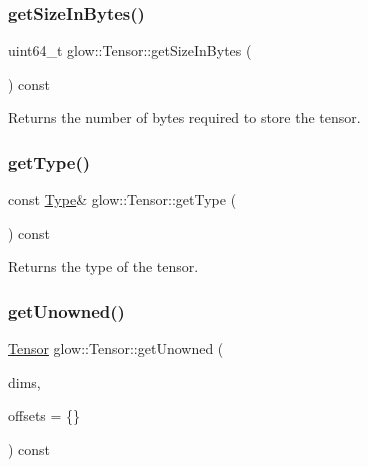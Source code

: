 \subsubsection{\texorpdfstring{get\+Size\+In\+Bytes()}{getSizeInBytes()}}
{\footnotesize\ttfamily uint64\+\_\+t glow\+::\+Tensor\+::get\+Size\+In\+Bytes (\begin{DoxyParamCaption}{ }\end{DoxyParamCaption}) const\hspace{0.3cm}{\ttfamily [inline]}}

\begin{DoxyReturn}{Returns}
the number of bytes required to store the tensor. 
\end{DoxyReturn}
\mbox{\label{classglow_1_1_tensor_aeb7622d21d76d06f4628386c9a2db733}} 
\subsubsection{\texorpdfstring{get\+Type()}{getType()}}
{\footnotesize\ttfamily const \hyperlink{structglow_1_1_type}{Type}\& glow\+::\+Tensor\+::get\+Type (\begin{DoxyParamCaption}{ }\end{DoxyParamCaption}) const\hspace{0.3cm}{\ttfamily [inline]}}

\begin{DoxyReturn}{Returns}
the type of the tensor. 
\end{DoxyReturn}
\mbox{\label{classglow_1_1_tensor_a2b71346a672215c780ec46d1925c6d03}} 
\subsubsection{\texorpdfstring{get\+Unowned()}{getUnowned()}}
{\footnotesize\ttfamily \hyperlink{classglow_1_1_tensor}{Tensor} glow\+::\+Tensor\+::get\+Unowned (\begin{DoxyParamCaption}\item[{llvm\+::\+Array\+Ref$<$ size\+\_\+t $>$}]{dims,  }\item[{llvm\+::\+Array\+Ref$<$ size\+\_\+t $>$}]{offsets = {\ttfamily \{\}} }\end{DoxyParamCaption}) const\hspace{0.3cm}{\ttfamily [inline]}}


